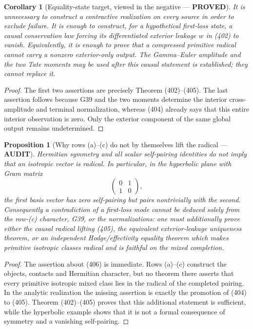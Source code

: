 \documentclass[11pt]{article}
\newtheorem{proposition}[theorem]{Proposition}
\newtheorem{corollary}[theorem]{Corollary}
\newcommand{\PROVED}{\textcolor{green!45!black}{\textbf{PROVED}}}
\newcommand{\AUDIT}{\textcolor{orange!75!black}{\textbf{AUDIT}}}
\begin{document}
\begin{corollary}[Equality-state target, viewed in the negative --- \PROVED]
It is unnecessary to construct a contractive realization on every source
in order to exclude failure.  It is enough to construct, for a hypothetical
first-loss state, a causal conservation law forcing its differentiated
exterior leakage
$w$ in (402) to vanish.  Equivalently, it is enough to prove that a
compressed primitive radical cannot carry a nonzero exterior-only output.
The Gamma--Euler amplitude and the two Tate moments may be used after this
causal statement is established; they cannot replace it.
\end{corollary}

\begin{proof}
The first two assertions are precisely Theorem (402)--(405).  The last
assertion follows because G39 and the two moments determine the interior
cross-amplitude and terminal normalization, whereas (404) already says that
this entire interior observation is zero.  Only the exterior component of
the same global output remains undetermined.
\end{proof}

\begin{proposition}[Why rows (a)--(c) do not by themselves lift the radical
--- \AUDIT]
Hermitian symmetry and all scalar self-pairing identities do not imply that
an isotropic vector is radical.  In particular, in the hyperbolic plane
with Gram matrix
\begin{equation}
 \begin{pmatrix}0&1\\[2pt]1&0\end{pmatrix},           \tag{406}
\end{equation}
the first basis vector has zero self-pairing but pairs nontrivially with the
second.  Consequently a contradiction of a first-loss mode cannot be
deduced solely from the row-(c) character, G39, or the normalizations: one
must additionally prove either the causal radical lifting (405), the
equivalent exterior-leakage uniqueness theorem, or an independent
Hodge/effectivity equality theorem which makes primitive isotropic classes
radical and is faithful on the mixed completion.
\end{proposition}

\begin{proof}
The assertion about (406) is immediate.  Rows (a)--(c) construct the
objects, contacts and Hermitian character, but no theorem there asserts
that every primitive isotropic mixed class lies in the radical of the
completed pairing.  In the analytic realization the missing assertion is
exactly the promotion of (404) to (405).  Theorem (402)--(405) proves that
this additional statement is sufficient, while the hyperbolic example
shows that it is not a formal consequence of symmetry and a vanishing
self-pairing.
\end{proof}
\end{document}
